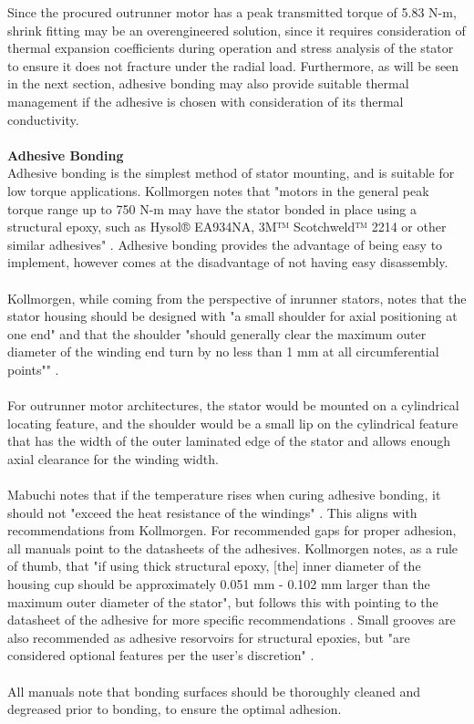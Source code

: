 \documentclass[internal]{../../classes/nervtech-research}
\begin{document}
Since the procured outrunner motor has a peak transmitted torque of 5.83 N-m, shrink fitting may be an overengineered solution, since it requires consideration of thermal expansion coefficients during operation and stress analysis of the stator to ensure it does not fracture under the radial load.
Furthermore, as will be seen in the next section, adhesive bonding may also provide suitable thermal management if the adhesive is chosen with consideration of its thermal conductivity.
\\\\
\textbf{Adhesive Bonding}
\\
Adhesive bonding is the simplest method of stator mounting, and is suitable for low torque applications.
Kollmorgen notes that "motors in the general peak torque range up to 750 N-m may have the stator bonded in place using a structural epoxy, such as Hysol® EA934NA, 3M™ Scotchweld™ 2214 or other similar adhesives" \cite{KollmorgenManual}.
Adhesive bonding provides the advantage of being easy to implement, however comes at the disadvantage of not having easy disassembly.
\\\\
Kollmorgen, while coming from the perspective of inrunner stators, notes that the stator housing should be designed with "a small shoulder for axial positioning at one end" and that the shoulder "should generally clear the maximum outer diameter of the winding end turn by no less than 1 mm at all circumferential points"" \cite{KollmorgenManual}.
\\\\
For outrunner motor architectures, the stator would be mounted on a cylindrical locating feature, and the shoulder would be a small lip on the cylindrical feature that has the width of the outer laminated edge of the stator and allows enough axial clearance for the winding width.
\\\\
Mabuchi notes that if the temperature rises when curing adhesive bonding, it should not "exceed the heat resistance of the windings" \cite{MabuchiManual}.
This aligns with recommendations from Kollmorgen.
For recommended gaps for proper adhesion, all manuals point to the datasheets of the adhesives.
Kollmorgen notes, as a rule of thumb, that "if using thick structural epoxy, [the] inner diameter of the housing cup should be approximately 0.051 mm - 0.102 mm larger than the maximum outer diameter of the stator", but follows this with pointing to the datasheet of the adhesive for more specific recommendations \cite{KollmorgenManual}.
Small grooves are also recommended as adhesive resorvoirs for structural epoxies, but "are considered optional features per the user's discretion" \cite{KollmorgenManual}.
\\\\
All manuals note that bonding surfaces should be thoroughly cleaned and degreased prior to bonding, to ensure the optimal adhesion.
\end{document}
